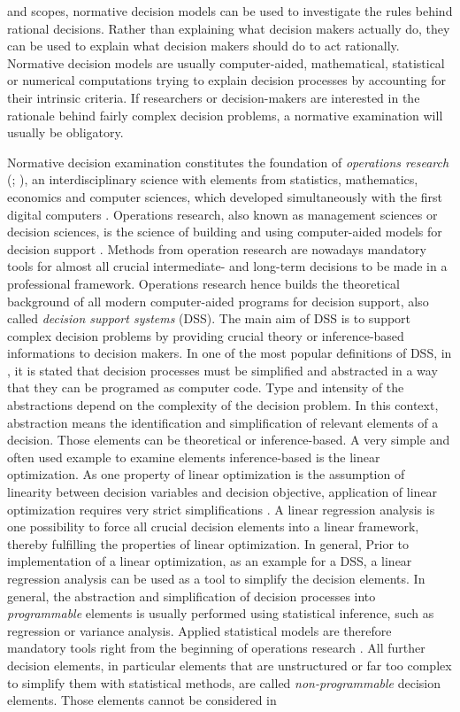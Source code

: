 and scopes, normative decision models can be used to investigate the rules behind rational decisions. Rather than explaining what decision makers actually do, they can be used to explain what decision makers should do to act rationally. Normative decision models are usually computer-aided, mathematical, statistical or numerical computations trying to explain decision processes by accounting for their intrinsic criteria. If researchers or decision-makers are interested in the rationale behind fairly complex decision problems, a normative examination will usually be obligatory.

Normative decision examination constitutes the foundation of \textit{operations research} (\citealp[p. 112]{shim_2002}; \citealp[p. 498]{simon_1979}), an interdisciplinary science with elements from statistics, mathematics, economics and computer sciences, which developed simultaneously with the first digital computers \citep{churchman_1957}. Operations research, also known as management sciences or decision sciences, is the science of building and using computer-aided models for decision support \citep[p. 373-374]{wacker_1998}. Methods from operation research are nowadays mandatory tools for almost all crucial intermediate- and long-term decisions to be made in a professional framework. Operations research hence builds the theoretical background of all modern computer-aided programs for decision support, also called \textit{decision support systems} (DSS). The main aim of DSS is to support complex decision problems by providing crucial theory or inference-based informations to decision makers. In one of the most popular definitions of DSS, in \citet[p. 26]{gorry_1971}, it is stated that decision processes must be simplified and abstracted in a way that they can be programed as computer code. Type and intensity of the abstractions depend on the complexity of the decision problem. In this context, abstraction means the identification and simplification of relevant elements of a decision. Those elements can be theoretical or inference-based. A very simple and often used example to examine elements inference-based is the linear optimization. As one property of linear optimization is the assumption of linearity between decision variables and decision objective, application of linear optimization requires very strict simplifications \citep[p. 129]{kangas_2015}. A linear regression analysis is one possibility to force all crucial decision elements into a linear framework, thereby fulfilling the properties of linear optimization. In general, Prior to implementation of a linear optimization, as an example for a DSS, a linear regression analysis can be used as a tool to simplify the decision elements. In general, the abstraction and simplification of decision processes into \textit{programmable} elements is usually performed using statistical inference, such as regression or variance analysis. Applied statistical models are therefore mandatory tools right from the beginning of operations research \citep{churchman_1957}. All further decision elements, in particular elements that are unstructured or far too complex to simplify them with statistical methods, are called \textit{non-programmable} decision elements. Those elements cannot be considered in 